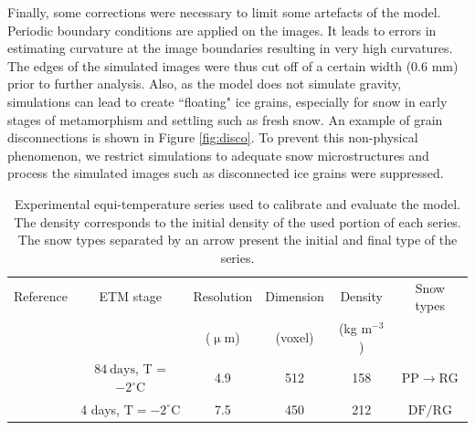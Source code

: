 \documentclass[draft,ms]{agujournal2019}
\begin{document}
Finally, some corrections were necessary to limit some artefacts of the model. Periodic boundary conditions are applied on the images. It leads to errors in estimating curvature at the image boundaries resulting in very high curvatures. The edges of the simulated images were thus cut off of a certain width (0.6 mm) prior to further analysis. Also, as the model does not simulate gravity, simulations can lead to create ``floating" ice grains,  especially for snow in early stages of metamorphism and settling such as fresh snow. An example of grain disconnections is shown in Figure \ref{fig:disco}. To prevent this non-physical phenomenon, we restrict simulations to adequate snow microstructures and process the simulated images such as disconnected ice grains were suppressed. 





\begin{table}
\hspace*{-0.5cm}
\begin{tabular}{|c|c|c|c|c|c|}
\hline Reference & ETM stage & Resolution & Dimension & Density & Snow types \\
 &  & ($\upmu$m) &(voxel) & (kg m$^{-3}$) &  \\
\hline 
\cite{flin_three-dimensional_2004} & $84\ \mathrm{days}$, T = $-2^{\circ} \mathrm{C}$ & 4.9 & 512 & 158 & \small{$\mathrm{PP} \rightarrow \mathrm{RG}$} \\
\cite{hagenmuller_motion_2019} & 4 days, $\mathrm{T}=-2^{\circ} \mathrm{C}$ & 7.5 & 450 & 212 & \small{$\mathrm{DF/RG}$} \\
\hline
\end{tabular}
\caption{Experimental equi-temperature series used to calibrate and evaluate the model. The density corresponds to the initial density of the used portion of each series. The snow types separated by an arrow present the initial and final type of the series.}
\label{tab:series_exp}
\end{table}
\end{document}
